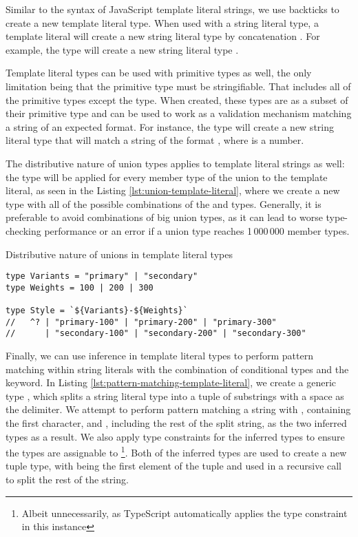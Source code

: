 Similar to the syntax of JavaScript template literal strings, we use backticks to create a new template literal type. When used with a string literal type, a template literal will create a new string literal type by concatenation \cite{DocumentationTemplateLiteral}. For example, the type  will create a new string literal type .

Template literal types can be used with primitive types as well, the only limitation being that the primitive type must be stringifiable. That includes all of the primitive types except the  type. When created, these types are as a subset of their primitive type and can be used to work as a validation mechanism matching a string of an expected format. For instance, the type  will create a new string literal type that will match a string of the format , where  is a number.

The distributive nature of union types applies to template literal strings as well: the type will be applied for every member type of the union to the template literal, as seen in the Listing \ref{lst:union-template-literal}, where we create a new  type with all of the possible combinations of the  and  types. Generally, it is preferable to avoid combinations of big union types, as it can lead to worse type-checking performance or an error if a union type reaches 1\,000\,000 member types.

\begin{listing}[ht]
  \caption{Distributive nature of unions in template literal types}\label{lst:union-template-literal}
  \begin{verbatim}
type Variants = "primary" | "secondary"
type Weights = 100 | 200 | 300

type Style = `${Variants}-${Weights}`
//   ^? | "primary-100" | "primary-200" | "primary-300" 
//      | "secondary-100" | "secondary-200" | "secondary-300"
\end{verbatim}
\end{listing}

Finally, we can use inference in template literal types to perform pattern matching within string literals with the combination of conditional types and the  keyword. In Listing \ref{lst:pattern-matching-template-literal}, we create a generic type , which splits a string literal type into a tuple of substrings with a space as the delimiter. We attempt to perform pattern matching a string with , containing the first character, and , including the rest of the split string, as the two inferred types as a result. We also apply type constraints for the inferred types to ensure the types are assignable to \footnote{Albeit unnecessarily, as TypeScript automatically applies the  type constraint in this instance}. Both of the inferred types are used to create a new tuple type, with  being the first element of the tuple and  used in a recursive call to split the rest of the string.

